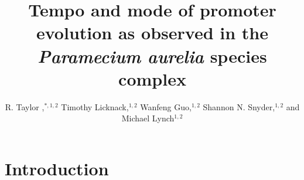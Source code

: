 \documentclass[nogrid]{MBE}%
\begin{document}
\title{Tempo and mode of promoter evolution as observed in the \textit{Paramecium aurelia} species complex}

\author[Raborn et al.]{R. Taylor ,$^{\ast,1,2}$ Timothy Licknack,$^{1,2}$ Wanfeng Guo,$^{1,2}$ Shannon N. Snyder,$^{1,2}$ and Michael Lynch$^{1,2}$}

\address{$^{1}$Biodesign Institute Center for the Mechanisms of Evolution\\
$^{2}$School of Life Sciences\\
Arizona State University, 797 E. Tyler Street, Tempe, AZ 85281}







\maketitle


\section{{Introduction}\label{sec:Intro}}
\end{document}
